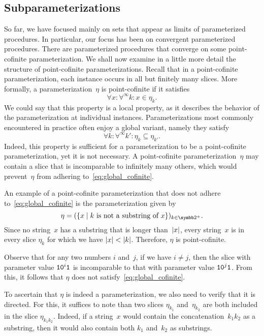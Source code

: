 \subsection{Subparameterizations}
\label{sec:computability:subparameterizations}%
So far, we have focused mainly on sets that appear as limits of parameterized procedures.
In particular, our focus has been on convergent parameterized procedures.
There are parameterized procedures that converge on some point-cofinite parameterization.
We shall now examine in a little more detail the structure of point-cofinite parameterizations.
Recall that in a point-cofinite parameterization, each instance occurs in all but finitely many slices.
More formally, a parameterization~$\eta$ is point-cofinite if it satisfies
\begin{equation*}
  \forall x\colon \forall^\infty k\colon x \in \eta_k.
\end{equation*}
We could say that this property is a local property, as it describes the behavior of the parameterization at individual instances.
Parameterizations most commonly encountered in practice \parencite{niedermeier2006invitation} often enjoy a global variant, namely they satisfy
\begin{equation}
\label{eq:global_cofinite}
  \forall k\colon \forall^\infty k'\colon \eta_k \subseteq \eta_{k'}.
\end{equation}
Indeed, this property is sufficient for a parameterization to be a point-cofinite parameterization, yet it is not necessary.
A point-cofinite parameterization~$\eta$ may contain a slice that is incomparable to infinitely many others, which would prevent~$\eta$ from adhering to~\eqref{eq:global_cofinite}.
\begin{example}
  An example of a point-cofinite parameterization that does not adhere to~\eqref{eq:global_cofinite} is the parameterization given by
  \begin{equation*}
    \eta \deq (\{x \st \text{$k$ is not a substring of $x$}\})_{k \in \binary^+}.
  \end{equation*}
  Since no string~$x$ has a substring that is longer than~${\lvert x\rvert}$, every string~$x$ is in every slice $\eta_k$ for which we have ${\lvert x\rvert} < {\lvert k\rvert}$.
  Therefore, $\eta$ is point-cofinite.

  Observe that for any two numbers $i$ and~$j$, if we have $i \ne j$, then the slice with parameter value $\textnormal{\texttt{1}}\textnormal{\texttt{0}}^i\textnormal{\texttt{1}}$ is incomparable to that with parameter value $\textnormal{\texttt{1}}\textnormal{\texttt{0}}^j\textnormal{\texttt{1}}$.
  From this, it follows that $\eta$ does not satisfy~\eqref{eq:global_cofinite}.

  To ascertain that $\eta$ is indeed a parameterization, we also need to verify that it is directed.
  For this, it suffices to note than two slices $\eta_{k_1}$ and~$\eta_{k_2}$ are both included in the slice $\eta_{k_1 k_2}$.
  Indeed, if a string~$x$ would contain the concatenation~$k_1 k_2$ as a substring, then it would also contain both $k_1$ and~$k_2$ as substrings.
\end{example}

